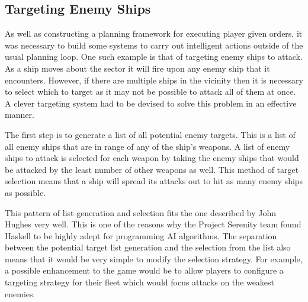 \subsection{Targeting Enemy Ships}

As well as constructing a planning framework for executing player given orders,
it was necessary to build some systems to carry out intelligent actions outside
of the usual planning loop. One such example is that of targeting enemy ships to
attack. As a ship moves about the sector it will fire upon any enemy ship that
it encounters. However, if there are multiple ships in the vicinity then it is
necessary to select which to target as it may not be possible to attack all of
them at once. A clever targeting system had to be devised to solve this problem
in an effective manner.

The first step is to generate a list of all potential enemy targets. This is a list
of all enemy ships that are in range of any of the ship's weapons. A list of
enemy ships to attack is selected for each weapon by taking the enemy ships that
would be attacked by the least number of other weapons as well. This method of
target selection means that a ship will spread its attacks out to hit as many
enemy ships as possible.

This pattern of list generation and selection fits the one described by John Hughes
very well.\cite{hughes1989whyfp} This is one of the reasons why the Project Serenity
team found Haskell to be highly adept for programming AI algorithms. The separation
between the potential target list generation and the selection from the list also means
that it would be very simple to modify the selection strategy. For example, a
possible enhancement to the game would be to allow players to configure a targeting
strategy for their fleet which would focus attacks on the weakest enemies.
